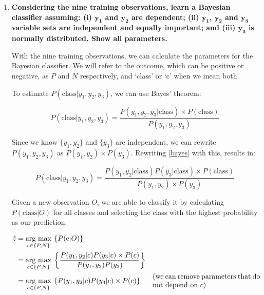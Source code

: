 \documentclass[12pt]{article}
\begin{document}
\begin{enumerate}[leftmargin=\labelsep]
    \item \textbf{Considering the nine training observations, learn a Bayesian classifier assuming:
    (i) $\boldsymbol{y_1}$ and $\boldsymbol{y_2}$ are dependent; (ii) {$\boldsymbol{y_1}$, $\boldsymbol{y_2}$} and {$\boldsymbol{y_3}$} variable sets are independent and equally
    important; and (iii) $\boldsymbol{y_3}$ is normally distributed. Show all parameters.}

    \vspace{10pt} 
    With the nine training observations, we can calculate the parameters for the Bayesian classifier.
    We will refer to the outcome, which can be positive or negative, as $P$ and $N$ respectively, and `class' or `c' when we mean both.

    \vspace{10pt} 
    To estimate $P(\text{class} | y_1, y_2, y_3)$, we can use Bayes' theorem:

    \begin{equation}\label{bayes}
        P(\text{class}| y_1, y_2, y_3) = \frac{P(y_1, y_2, y_3 | \text{class}) \times P(\text{class})}{P(y_1, y_2, y_3)}
    \end{equation}

    Since we know $\{y_1, y_2\}$ and $\{y_3\}$ are independent,
    we can rewrite $P(y_1, y_2, y_3)$ as $P(y_1, y_2) \times P(y_3)$.
    Rewriting \eqref{bayes} with this, results in:

    \begin{equation}\label{bayes2}
        P(\text{class}| y_1, y_2, y_3) = \frac{P(y_1, y_2 | \text{class}) P(y_3 | \text{class}) \times P(\text{class})}{P(y_1, y_2) \times P(y_3)}
    \end{equation}

    \vspace{10pt}
    Given a new observation $O$, we are able to classify it by calculating $P(\text{class}|O)$ for all classes and selecting the class with the
    highest probability as our prediction.

    \begin{equation}\label{ex1-map}
        \begin{aligned}
            \hat{z} & = \underset{c \in \{P, N\}}{\text{arg max}} \medspace \left\{P(\text{c} | O)\right\}                                                                               \\
            & = \underset{c \in \{P, N\}}{\text{arg max}} \medspace \left\{\frac{P(y_1, y_2 | c) P(y_3 | c) \times P(c)}{P(y_1, y_2) P(y_3)}\right\} \\
            & = \underset{c \in \{P, N\}}{\text{arg max}} \medspace \left\{P(y_1, y_2 | c) P(y_3 | c) \times P(c)\right\}
            & \parbox{15em}{(we can remove parameters that do not depend on $c$)}
        \end{aligned}
    \end{equation}


\end{enumerate}
\end{document}
